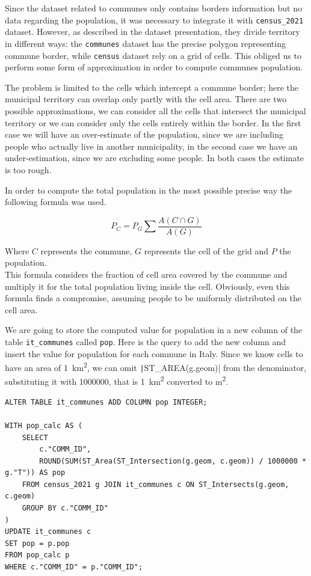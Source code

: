 Since the dataset related to communes only contains borders information but no data regarding the population, it was necessary to integrate it with \texttt{census\_2021} dataset.
However, as described in the dataset presentation, they divide territory in different ways: the \texttt{communes} dataset has the precise polygon representing commune border, while \texttt{census} dataset rely on a grid of cells.
This obliged us to perform some form of approximation in order to compute communes population.

The problem is limited to the cells which intercept a commune border; here the municipal territory can overlap only partly with the cell area.
There are two possible approximations, we can consider all the cells that intersect the municipal territory or we can consider only the cells entirely within the border.
In the first case we will have an over-estimate of the population, since we are including people who actually live in another municipality, in the second case we have an under-estimation, since we are excluding some people.
In both cases the estimate is too rough.

In order to compute the total population in the most possible precise way the following formula was used.

\begin{equation}
	P_{C} = P_{G} \sum \frac{A(C \cap G)}{A(G)}
\end{equation}

Where $C$ represents the commune, $G$ represents the cell of the grid and $P$ the population.\\
This formula considers the fraction of cell area covered by the commune and multiply it for the total population living inside the cell.
Obviously, even this formula finds a compromise, assuming people to be uniformly distributed on the cell area.

We are going to store the computed value for population in a new column of the table \texttt{it\_communes} called \texttt{pop}.
Here is the query to add the new column and insert the value for population for each commune in Italy.
Since we know cells to have an area of \qty{1}{km^2}, we can omit \texttt|ST_AREA(g.geom)| from the denominator, substituting it with \num{1000000}, that is \qty{1}{km^2} converted to \si{m^2}.

\begin{verbatim}
ALTER TABLE it_communes ADD COLUMN pop INTEGER;

WITH pop_calc AS (
	SELECT 
		c."COMM_ID",
		ROUND(SUM(ST_Area(ST_Intersection(g.geom, c.geom)) / 1000000 * g."T")) AS pop
	FROM census_2021 g JOIN it_communes c ON ST_Intersects(g.geom, c.geom)
	GROUP BY c."COMM_ID"
)
UPDATE it_communes c
SET pop = p.pop
FROM pop_calc p
WHERE c."COMM_ID" = p."COMM_ID";
\end{verbatim}




